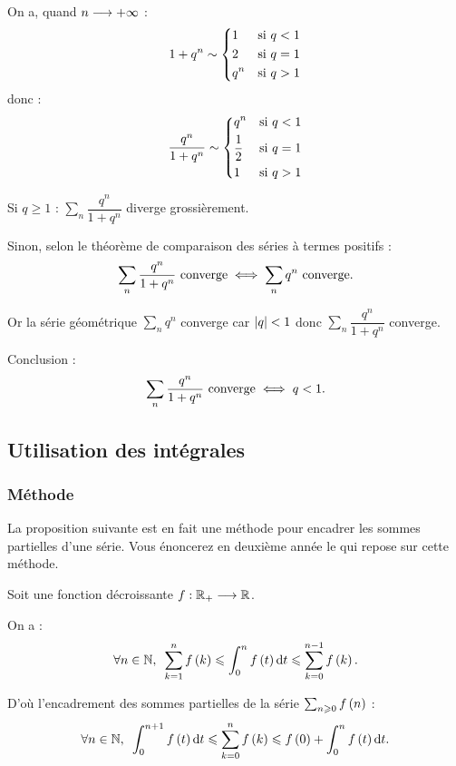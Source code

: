 \begin{corr}[2]
On a, quand \(n\longrightarrow+\infty\) : \[1+q^n\sim\begin{dcases}
1 &\text{si }q<1 \\
2 &\text{si }q=1 \\
q^n &\text{si }q>1
\end{dcases}\] donc : \[\dfrac{q^n}{1+q^n}\sim\begin{dcases}
q^n &\text{si }q<1 \\
\dfrac{1}{2} &\text{si }q=1 \\
1 &\text{si }q>1
\end{dcases}\]

Si \(q\geq1\) : \(\sum_n\dfrac{q^n}{1+q^n}\) diverge grossièrement.

Sinon, selon le théorème de comparaison des séries à termes positifs : \[\sum_n\dfrac{q^n}{1+q^n}\text{ converge}\iff\sum_nq^n\text{ converge}.\]

Or la série géométrique \(\sum_nq^n\) converge car \(\left\lvert q\right\rvert<1\) donc \(\sum_n\dfrac{q^n}{1+q^n}\) converge.

Conclusion : \[\sum_n\dfrac{q^n}{1+q^n}\text{ converge}\iff q<1.\]
\end{corr}

\subsection{Utilisation des intégrales}

\subsubsection{Méthode}

\begin{rem}
La proposition suivante est en fait une méthode pour encadrer les sommes partielles d'une série. Vous énoncerez en deuxième année le  qui repose sur cette méthode.
\end{rem}

\begin{prop}
Soit une fonction décroissante \(f:\mathbb{R}_+\longrightarrow\mathbb{R}\).

On a : \[\quantifs{\forall n\in\N}\sum_{k=1}^nf\paren{k}\leq\int_0^nf\paren{t}\odif{t}\leq\sum_{k=0}^{n-1}f\paren{k}.\]

D'où l'encadrement des sommes partielles de la série \(\sum_{n\geqslant0}f\left(n\right)\) : \[\quantifs{\forall n\in\N}\int_0^{n+1}f\paren{t}\odif{t}\leq\sum_{k=0}^nf\paren{k}\leq f\paren{0}+\int_0^nf\paren{t}\odif{t}.\]
\end{prop}

